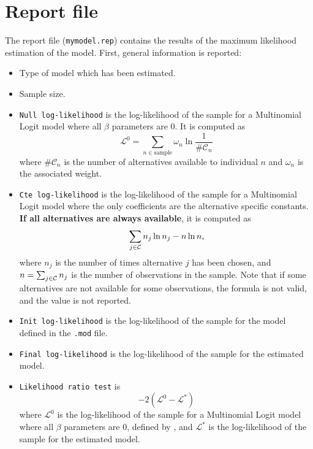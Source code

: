 \documentclass[12pt]{memoir}
\begin{document}
\section{Report file}
\label{sec:report}
    The report file (\texttt{mymodel.rep}) contains the results of the maximum likelihood estimation of the model. First, general information is reported:
   \begin{itemize}
      \item Type of model which has been estimated.
      \item Sample size.
      \item \verb+Null log-likelihood+ is the log-likelihood of the sample for a Multinomial Logit model where all $\beta$ parameters are 0. It is computed as
         \begin{equation}
            \label{eq:l0}
            \mathcal{L}^0 = \sum_{n \in \text{sample}} \omega_n \ln \frac{1}{\# \mathcal{C}_n}
         \end{equation}
         where $\# \mathcal{C}_n$ is the number of alternatives available to
         individual $n$ and $\omega_n$ is the associated weight.
      \item \verb+Cte log-likelihood+ is the log-likelihood of the
sample for a Multinomial Logit model where the only coefficients are
the alternative specific constants. \textbf{If all alternatives are
always available},  it is computed as
\begin{equation}
\sum_{j \in \mathcal{C}} n_j \ln n_j - n \ln n,
\end{equation}
where $n_j$ is the number of times alternative $j$ has been chosen,
and $n=\sum_{j \in \mathcal{C}} n_j$ is the number of observations in the
sample. Note that if some alternatives are not available for some
observations, the formula is not valid, and the value is not reported. 
      \item \verb+Init log-likelihood+ is the log-likelihood of the sample for the model defined in the \verb+.mod+ file. 
      \item \verb+Final log-likelihood+ is the log-likelihood of the sample for the estimated model. 
      \item \verb+Likelihood ratio test+ is 
         \begin{equation}
            -2 ( \mathcal{L}^0 - \mathcal{L}^*)
         \end{equation}
         where 
         $ \mathcal{L}^0$ is the log-likelihood of the sample for a Multinomial Logit model where all $\beta$ parameters are 0, defined by  , and $\mathcal{L}^*$ is the log-likelihood of the sample for the estimated model. 

\end{itemize}
\end{document}
